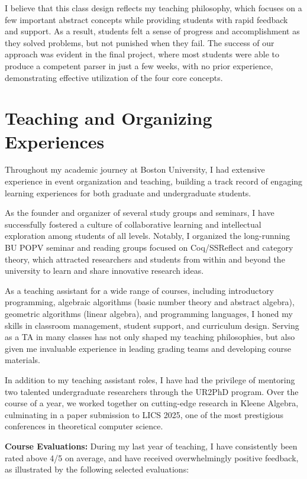 \documentclass[11pt,a4paper,sans]{moderncv} %
\begin{document}
I believe that this class design reflects my teaching philosophy, which focuses on a few important abstract concepts while providing students with rapid feedback and support. 
As a result, students felt a sense of progress and accomplishment as they solved problems, but not punished when they fail. 
The success of our approach was evident in the final project, where most students were able to produce a competent parser in just a few weeks, with no prior experience, demonstrating effective utilization of the four core concepts.

\section{Teaching and Organizing Experiences}

Throughout my academic journey at Boston University, I had extensive experience in event organization and teaching, building a track record of engaging learning experiences for both graduate and undergraduate students.

As the founder and organizer of several study groups and seminars, I have successfully fostered a culture of collaborative learning and intellectual exploration among students of all levels. 
Notably, I organized the long-running BU POPV seminar and reading groups focused on Coq/SSReflect and category theory, which attracted researchers and students from within and beyond the university to learn and share innovative research ideas.

As a teaching assistant for a wide range of courses, including introductory programming, algebraic algorithms (basic number theory and abstract algebra), geometric algorithms (linear algebra), and programming languages, I honed my skills in classroom management, student support, and curriculum design. 
Serving as a TA in many classes has not only shaped my teaching philosophies, but also given me invaluable experience in leading grading teams and developing course materials.

In addition to my teaching assistant roles, I have had the privilege of mentoring two talented undergraduate researchers through the UR2PhD program. 
Over the course of a year, we worked together on cutting-edge research in Kleene Algebra, culminating in a paper submission to LICS 2025, one of the most prestigious conferences in theoretical computer science.

\textbf{Course Evaluations:}
During my last year of teaching, I have consistently been rated above 4/5 on average, and have received overwhelmingly positive feedback, as illustrated by the following selected evaluations:
\end{document}
